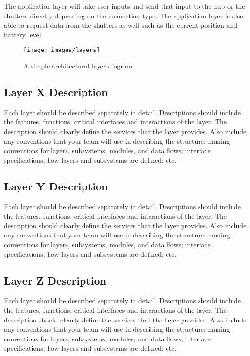 The application layer will take user inputs and send that input to the hub or the shutters directly depending on the connection type. The application layer is also able to request data from the shutters as well such as the current position and battery level 

\begin{figure}[h!]
	\centering
 	\texttt{[image: images/layers]}
 \caption{A simple architectural layer diagram}
\end{figure}

\subsection{Layer X Description}
Each layer should be described separately in detail. Descriptions should include the features, functions, critical interfaces and interactions of the layer. The description should clearly define the services that the layer provides. Also include any conventions that your team will use in describing the structure: naming conventions for layers, subsystems, modules, and data flows; interface specifications; how layers and subsystems are defined; etc. 

\subsection{Layer Y Description}
Each layer should be described separately in detail. Descriptions should include the features, functions, critical interfaces and interactions of the layer. The description should clearly define the services that the layer provides. Also include any conventions that your team will use in describing the structure: naming conventions for layers, subsystems, modules, and data flows; interface specifications; how layers and subsystems are defined; etc. 

\subsection{Layer Z Description}
Each layer should be described separately in detail. Descriptions should include the features, functions, critical interfaces and interactions of the layer. The description should clearly define the services that the layer provides. Also include any conventions that your team will use in describing the structure: naming conventions for layers, subsystems, modules, and data flows; interface specifications; how layers and subsystems are defined; etc. 